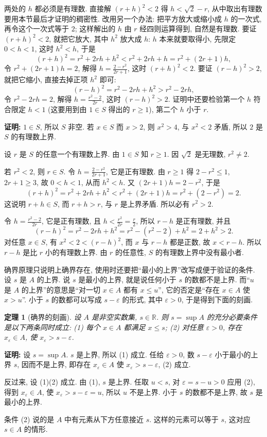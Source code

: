 \documentclass[UTF8,openany]{ctexbook}
\theoremstyle{chinesetextbook}
\newtheorem{theorem}{定理}[section]
\newenvironment{cnproof}{\par\indent\textbf{证明:} \ignorespaces}{\par}
\begin{document}
两处的 $h$ 都必须是有理数. 直接解 $(r+h)^2<2$ 得 $h<\sqrt2-r$, 从中取出有理数要用本节最后才证明的稠密性. 改用另一个办法: 把平方放大或缩小成 $h$ 的一次式, 再令这个一次式等于 $2$; 这样解出的 $h$ 由 $r$ 经四则运算得到, 自然是有理数. 要证 $(r+h)^2<2$, 就把它放大, 其中 $h^2$ 放大成 $h$: $h$ 本来就要取得小, 先限定 $0<h<1$, 这时 $h^2<h$, 于是
\[
(r+h)^2=r^2+2rh+h^2<r^2+2rh+h=r^2+(2r+1)h,
\]
令 $r^2+(2r+1)h=2$, 解得 $\displaystyle h=\frac{2-r^2}{2r+1}$, 这时 $(r+h)^2<2$. 要证 $(r-h)^2>2$, 就把它缩小, 直接去掉正项 $h^2$ 即可:
\[
(r-h)^2=r^2-2rh+h^2>r^2-2rh,
\]
令 $r^2-2rh=2$, 解得 $\displaystyle h=\frac{r^2-2}{2r}$, 这时 $(r-h)^2>2$. 证明中还要检验第一个 $h$ 符合限定 $h<1$ (这要用到由 $1\in S$ 得出的 $r\ge1$), 第二个 $h$ 小于 $r$.
\begin{cnproof}
$1\in S$, 所以 $S$ 非空. 若 $x\in S$ 而 $x>2$, 则 $x^2>4$, 与 $x^2<2$ 矛盾, 所以 $2$ 是 $S$ 的有理数上界.

设 $r$ 是 $S$ 的任意一个有理数上界. 由 $1\in S$ 知 $r\ge1$. 因 $\sqrt2$ 是无理数, $r^2\ne2$.

若 $r^2<2$, 则 $r\in S$. 令 $\displaystyle h=\frac{2-r^2}{2r+1}$, 它是正有理数. 由 $r\ge1$ 得 $2-r^2\le1$, $2r+1\ge3$, 故 $0<h<1$, 从而 $h^2<h$. 又 $(2r+1)h=2-r^2$, 于是
\[
(r+h)^2=r^2+2rh+h^2<r^2+(2r+1)h=r^2+(2-r^2)=2.
\]
这说明 $r+h\in S$, 而 $r+h>r$, 与 $r$ 是上界矛盾. 所以必有 $r^2>2$.

令 $\displaystyle h=\frac{r^2-2}{2r}$, 它是正有理数, 且 $\displaystyle h<\frac{r^2}{2r}=\frac r2$, 所以 $r-h$ 是正有理数, 并且
\[
(r-h)^2=r^2-2rh+h^2=r^2-(r^2-2)+h^2=2+h^2>2.
\]
对任意 $x\in S$, 有 $x^2<2<(r-h)^2$, 而 $x$ 与 $r-h$ 都是正数, 故 $x<r-h$. 所以 $r-h$ 是比 $r$ 小的有理数上界. 由 $r$ 的任意性, $S$ 的有理数上界中没有最小者.
\end{cnproof}


确界原理只说明上确界存在, 使用时还要把“最小的上界”改写成便于验证的条件. 设 $s$ 是 $A$ 的上界. 说 $s$ 是最小的上界, 就是说任何小于 $s$ 的数都不是上界. 而“$u$ 是 $A$ 的上界”的意思是“对一切 $x\in A$ 都有 $x\le u$”, 它的否定是“存在 $x\in A$ 使 $x>u$”. 小于 $s$ 的数都可以写成 $s-\varepsilon$ 的形式, 其中 $\varepsilon>0$, 于是得到下面的刻画.
\begin{theorem}[确界的刻画]
设 $A$ 是非空实数集, $s\in\mathbb R$. 则 $s=\sup A$ 的充分必要条件是以下两条同时成立: \textup{(1)} 每个 $x\in A$ 都满足 $x\le s$; \textup{(2)} 对任意 $\varepsilon>0$, 存在 $x_\varepsilon\in A$, 使 $x_\varepsilon>s-\varepsilon$.
\end{theorem}
\begin{cnproof}
设 $s=\sup A$. $s$ 是上界, 所以 (1) 成立. 任给 $\varepsilon>0$, 数 $s-\varepsilon$ 小于最小的上界 $s$, 因而不是上界, 即存在 $x_\varepsilon\in A$ 使 $x_\varepsilon>s-\varepsilon$, (2) 成立.

反过来, 设 (1)(2) 成立. 由 (1), $s$ 是上界. 任取 $u<s$, 对 $\varepsilon=s-u>0$ 应用 (2), 得到 $x_\varepsilon\in A$, 使 $x_\varepsilon>s-\varepsilon=u$, 所以 $u$ 不是上界. 小于 $s$ 的数都不是上界, 故 $s$ 是最小的上界.
\end{cnproof}
条件 (2) 说的是 $A$ 中有元素从下方任意接近 $s$. 这样的元素可以等于 $s$, 这对应 $s\in A$ 的情形.
\end{document}
